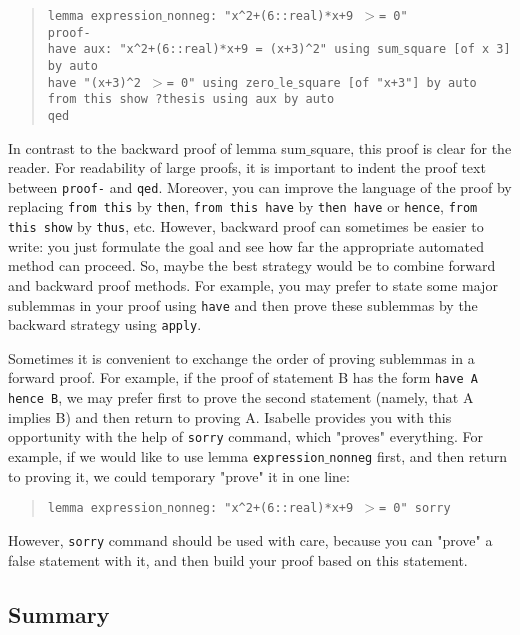 \documentclass[11pt]{article}
\newcommand{\ind}{\phantom{a}\quad}
\newcommand{\prog}[1]{\par\noindent\begin{quote}#1\end{quote}\par\noindent}
\begin{document}
\prog{\tt lemma expression$\_$nonneg: "x\^{}2+(6::real)*x+9 $>$= 0"\\
proof-\\
\ind have aux: "x\^{}2+(6::real)*x+9 = (x+3)\^{}2" using sum$\_$square [of x 3] by auto \\
\ind have "(x+3)\^{}2 $>$= 0" using zero$\_$le$\_$square [of "x+3"] by auto \\
\ind from this show ?thesis using aux by auto\\
qed}%

In contrast to the backward proof of lemma sum$\_$square, this proof is clear for the reader. For readability of large proofs, it is important to indent the proof text between {\tt proof-} and {\tt qed}. Moreover, you can improve the language of the proof by replacing {\tt from this} by {\tt then}, {\tt from this have} by {\tt then have} or {\tt hence}, {\tt from this show} by {\tt thus}, etc. However, backward proof can sometimes be easier to write: you just formulate the goal and see how far the appropriate automated method can proceed. So, maybe the best strategy would be to combine forward and backward proof methods. For example, you may prefer to state some major sublemmas in your proof using {\tt have} and then prove these sublemmas by the backward strategy using {\tt apply}.

Sometimes it is convenient to exchange the order of proving sublemmas in a forward proof. For example, if the proof of statement B has the form {\tt have A hence B}, we may prefer first to prove the second statement (namely, that A implies B) and then return to proving A. Isabelle provides you with this opportunity with the help of {\tt sorry} command, which "proves" everything. For example, if we would like to use lemma {\tt expression$\_$nonneg} first, and then return to proving it, we could temporary "prove" it in one line:
\prog{\tt lemma expression$\_$nonneg: "x\^{}2+(6::real)*x+9 $>$= 0" sorry}%
However, {\tt sorry} command should be used with care, because you can "prove" a false statement with it, and then build your proof based on this statement.

\subsection{Summary}
\end{document}
